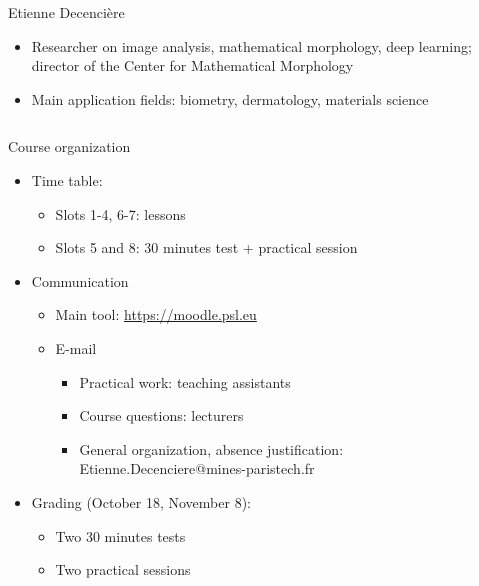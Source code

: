\documentclass[xcolor=pdftex,dvipsnames,table,mathserif]{beamer}
\begin{document}
{\begin{columns}
\begin{column}{.8\textwidth}
    \begin{block}{Etienne Decencière}
      \scriptsize{
    \begin{itemize}
    \item Researcher on image analysis, mathematical morphology, deep learning; director of the Center for Mathematical Morphology
    \item Main application fields: biometry, dermatology, materials science
    \end{itemize}
    }
  \end{block}

  \end{column}
\end{columns}

}

\begin{frame}{Course organization}

  \begin{itemize}

  \item Time table:
    \begin{itemize}
    \item Slots 1-4, 6-7: lessons
    \item Slots 5 and 8: 30 minutes test + practical session
    \end{itemize}
  \item Communication
    \begin{itemize}
    \item Main tool: \url{https://moodle.psl.eu}
    \item E-mail
      \begin{itemize}
      \item Practical work: teaching assistants
      \item Course questions: lecturers
      \item General organization, absence justification: Etienne.Decenciere@mines-paristech.fr
      \end{itemize}
    \end{itemize}
  \item Grading (October 18, November 8):
    \begin{itemize}
    \item Two 30 minutes tests
    \item Two practical sessions
    \end{itemize}

  \end{itemize}
\end{frame}
\end{document}
